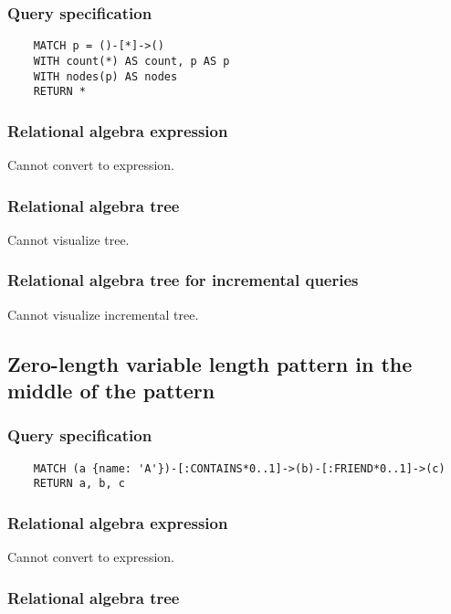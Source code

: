 	\subsubsection*{Query specification}

	\begin{lstlisting}
	MATCH p = ()-[*]->()
	WITH count(*) AS count, p AS p
	WITH nodes(p) AS nodes
	RETURN *
	\end{lstlisting}


	\subsubsection*{Relational algebra expression}

	Cannot convert to expression.

	\subsubsection*{Relational algebra tree}

	Cannot visualize tree.

	\subsubsection*{Relational algebra tree for incremental queries}

	Cannot visualize incremental tree.
	\subsection{Zero-length variable length pattern in the middle of the pattern}

	\subsubsection*{Query specification}

	\begin{lstlisting}
	MATCH (a {name: 'A'})-[:CONTAINS*0..1]->(b)-[:FRIEND*0..1]->(c)
	RETURN a, b, c
	\end{lstlisting}


	\subsubsection*{Relational algebra expression}

	Cannot convert to expression.

	\subsubsection*{Relational algebra tree}

